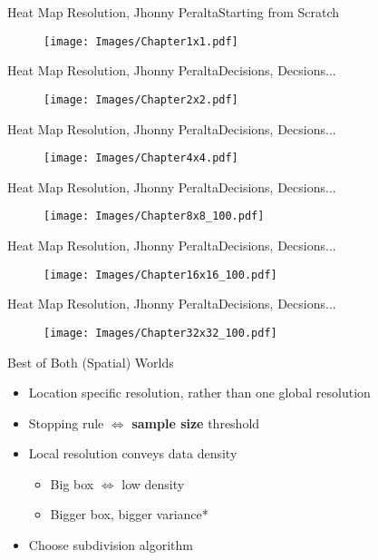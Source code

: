 \documentclass{beamer}
\begin{document}
\begin{frame}{Heat Map Resolution, Jhonny Peralta}{Starting from Scratch}
  \begin{figure}[H]
	\texttt{[image: Images/Chapter1x1.pdf]}
	\end{figure}
\end{frame}

\begin{frame}{Heat Map Resolution, Jhonny Peralta}{Decisions, Decsions...}
  \begin{figure}[H]
	\texttt{[image: Images/Chapter2x2.pdf]}
	\end{figure}
\end{frame}

\begin{frame}{Heat Map Resolution, Jhonny Peralta}{Decisions, Decsions...}
  \begin{figure}[H]
	\texttt{[image: Images/Chapter4x4.pdf]}
	\end{figure}
\end{frame}

\begin{frame}{Heat Map Resolution, Jhonny Peralta}{Decisions, Decsions...}
  \begin{figure}[H]
	\texttt{[image: Images/Chapter8x8\_100.pdf]}
	\end{figure}
\end{frame}

\begin{frame}{Heat Map Resolution, Jhonny Peralta}{Decisions, Decsions...}
  \begin{figure}[H]
	\texttt{[image: Images/Chapter16x16\_100.pdf]}
	\end{figure}
\end{frame}

\begin{frame}{Heat Map Resolution, Jhonny Peralta}{Decisions, Decsions...}
  \begin{figure}[H]
	\texttt{[image: Images/Chapter32x32\_100.pdf]}
	\end{figure}
\end{frame}

\begin{frame}{Best of Both (Spatial) Worlds}{}
\begin{itemize}
\addtolength{\itemsep}{0.5\baselineskip}
\item Location specific resolution, rather than one global resolution
\item Stopping rule $\iff$ {\bf sample size} threshold
\item Local resolution conveys data density
  \begin{itemize}
  \addtolength{\itemsep}{0.5\baselineskip}
  \item Big box $\iff$ low density
  \item Bigger box, bigger variance*
  \end{itemize}
\item Choose subdivision algorithm
\end{itemize}
\end{frame}
\end{document}
